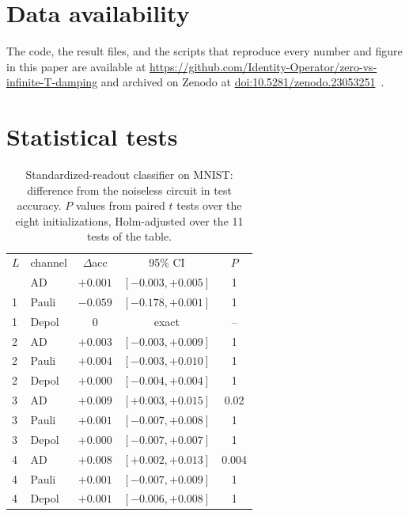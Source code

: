 \documentclass[
 aps,pra,
 twocolumn,
 superscriptaddress,
 longbibliography,
 nofootinbib
]{revtex4-2}
\begin{document}
\section*{Data availability}
The code, the result files, and the scripts that reproduce every number and
figure in this paper are available at
\url{https://github.com/Identity-Operator/zero-vs-infinite-T-damping} and archived
on Zenodo at \href{https://doi.org/10.5281/zenodo.23053251}{doi:10.5281/zenodo.23053251}~\cite{nguyen2026zenodo}.

\appendix

\section{Statistical tests}
\label{app:stats}

\begin{table}[t]
\caption{Standardized-readout classifier on MNIST: difference from the
noiseless circuit in test accuracy. $P$ values from paired $t$ tests over the
eight initializations, Holm-adjusted over the 11 tests of the table.}
\label{tab:stats}
\begin{ruledtabular}
\begin{tabular}{llccc}
$L$ & channel & $\Delta$acc & 95\% CI & $P$\\
\colrule
1 & AD & $+0.001$ & $[-0.003,+0.005]$ & 1\\
1 & Pauli & $-0.059$ & $[-0.178,+0.001]$ & 1\\
1 & Depol & $0$ & exact & --\\
2 & AD & $+0.003$ & $[-0.003,+0.009]$ & 1\\
2 & Pauli & $+0.004$ & $[-0.003,+0.010]$ & 1\\
2 & Depol & $+0.000$ & $[-0.004,+0.004]$ & 1\\
3 & AD & $+0.009$ & $[+0.003,+0.015]$ & 0.02\\
3 & Pauli & $+0.001$ & $[-0.007,+0.008]$ & 1\\
3 & Depol & $+0.000$ & $[-0.007,+0.007]$ & 1\\
4 & AD & $+0.008$ & $[+0.002,+0.013]$ & 0.004\\
4 & Pauli & $+0.001$ & $[-0.007,+0.009]$ & 1\\
4 & Depol & $+0.001$ & $[-0.006,+0.008]$ & 1\\
\end{tabular}
\end{ruledtabular}
\end{table}
\end{document}
